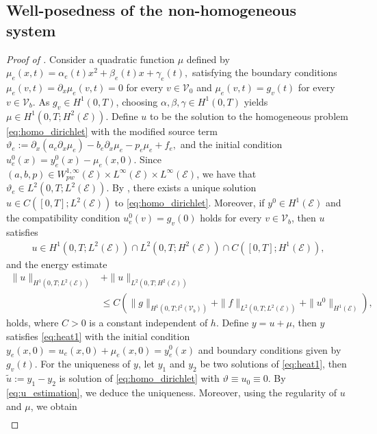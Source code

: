 \documentclass[a4paper, 10pt, english]{article}
\begin{document}
\subsection{Well-posedness of the non-homogeneous system}
\begin{proof}[Proof of ]
    Consider a quadratic function $\mu$ defined by $\mu_e(x,t) = \alpha_e(t) x^2 + \beta_e(t) x + \gamma_e(t),$ satisfying the boundary conditions $\mu_e(v,t) = \partial_x \mu_e(v,t) = 0$ for every $v \in \mathcal{V}_0$ and $ \mu_e(v,t) = g_v(t)$ for every $v \in \mathcal{V}_b$. As $g_v \in H^1(0,T)$, choosing $\alpha,\beta,\gamma \in H^1(0,T)$ yields $\mu \in H^1(0,T; H^2(\mathcal{E}))$. Define $u$ to be the solution to the homogeneous problem \eqref{eq:homo_dirichlet} with the modified source term $\vartheta_e := \partial_x(a_e \partial_x \mu_e) - b_e \partial_x \mu_e - p_e \mu_e + f_e,$ and the initial condition $ u^0_e(x) = y^0_e(x) - \mu_e(x,0)$. Since $(a, b, p) \in W^{1,\infty}_{pw}(\mathcal{E}) \times L^{\infty}(\mathcal{E}) \times L^{\infty}(\mathcal{E})$, we have that $\vartheta_e\in L^2(0,T; L^2(\mathcal{E}))$.
    By , there exists a unique solution $u \in C([0,T]; L^2(\mathcal{E}))$ to \eqref{eq:homo_dirichlet}. Moreover, if $y^0 \in H^1(\mathcal{E})$ and the compatibility condition $u^0_e(v) = g_v(0)$ holds for every $v \in \mathcal{V}_b$, then $u$ satisfies
    \begin{align*}
        u \in H^1(0,T; L^2(\mathcal{E})) \cap L^2(0,T; H^2(\mathcal{E})) \cap C([0,T]; H^1(\mathcal{E})),
    \end{align*}
    and the energy estimate
    \begin{align*}
        \|u\|_{H^1(0,T; L^2(\mathcal{E}))} &+ \|u\|_{L^2(0,T; H^2(\mathcal{E}))} \\
        &\leq C \left( \|g\|_{H^1(0,T; l^2(\mathcal{V}_b))} + \|f\|_{L^2(0,T; L^2(\mathcal{E}))} + \|u^0\|_{H^1(\mathcal{E})} \right),
    \end{align*}
    holds, where $C > 0$ is a constant independent of $h$. Define $y = u + \mu$, then $y$ satisfies \eqref{eq:heat1} with the initial condition $y_e(x,0) = u_e(x,0) + \mu_e(x,0) = y^0_e(x)$ and boundary conditions given by $g_v(t)$. For the uniqueness of $y$, let $y_1$ and $y_2$ be two solutions of \eqref{eq:heat1}, then $\tilde u:= y_1-y_2$ is solution of \eqref{eq:homo_dirichlet} with $\vartheta\equiv u_0\equiv 0$. By \eqref{eq:u_estimation}, we deduce the uniqueness. Moreover, using the regularity of $u$ and $\mu$, we obtain
    \begin{align*}

\end{align*}
\end{proof}
\end{document}
